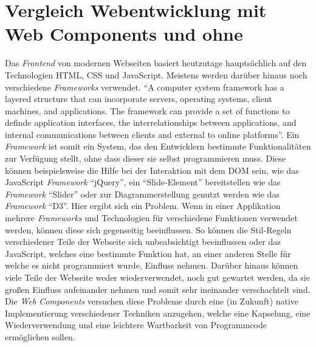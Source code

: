 \documentclass[12pt, paper=a4, bibtotoc, toc=listof, headsepline=true]{scrreprt}
\begin{document}
	\section{Vergleich Webentwicklung mit Web Components und ohne}
	Das \emph{Frontend} von modernen Webseiten basiert heutzutage hauptsächlich auf den Technologien \ac{HTML}, \ac{CSS} und JavaScript. Meistens werden darüber hinaus noch verschiedene \emph{Frameworks} verwendet. \enquote{A computer system framework has a layered structure that can incorporate servers, operating systems, client machines, and applications. The framework can provide a set of functions to definde application interfaces, the interrelationships between applications, and internal communications between clients and external to online platforms}.\cite[S.15]{stuart2013roadmap} Ein \emph{Framework} ist somit ein System, das den Entwicklern bestimmte Funktionalitäten zur Verfügung stellt, ohne dass dieser sie selbst programmieren muss. Diese können beispielsweise die Hilfe bei der Interaktion mit dem \ac{DOM} sein, wie das JavaScript \emph{Framework} \enquote{jQuery}, ein \enquote{Slide-Element} bereitstellen wie das \emph{Framework} \enquote{Slider} oder zur Diagrammerstellung genutzt werden wie das \emph{Framework} \enquote{D3}. Hier ergibt sich ein Problem. Wenn in einer Applikation mehrere \emph{Frameworks} und Technologien für verschiedene Funktionen verwendet werden, können diese sich gegenseitig beeinflussen. So können die Stil-Regeln verschiedener Teile der Webseite sich unbeabsichtigt beeinflussen oder das JavaScript, welches eine bestimmte Funktion hat, an einer anderen Stelle für welche es nicht programmiert wurde, Einfluss nehmen. Darüber hinaus können viele Teile der Webseite weder wiederverwendet, noch gut gewartet werden, da sie großen Einfluss aufeinander nehmen und somit sehr ineinander verschachtelt sind.
	Die \emph{Web Components} versuchen diese Probleme durch eine (in Zukunft) native Implementierung verschiedener Techniken anzugehen, welche eine Kapselung, eine Wiederverwendung und eine leichtere Wartbarkeit von Programmcode ermöglichen sollen.			
\end{document}

